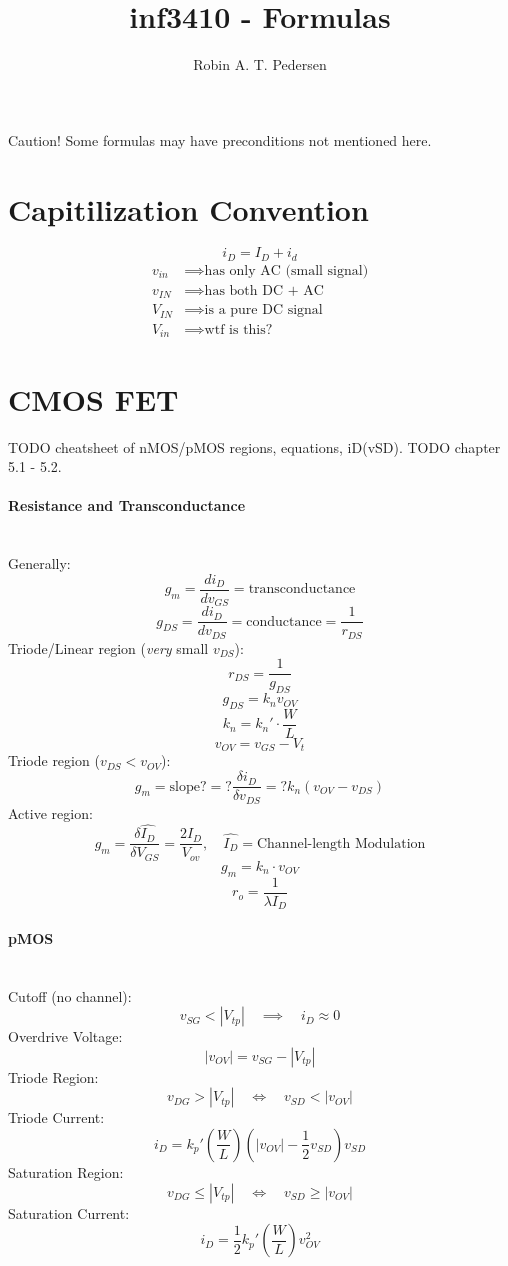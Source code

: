 \documentclass[twocolumn]{article}
\begin{document}
  \title{inf3410 - Formulas}
  \author{Robin A. T. Pedersen}
  \maketitle

  Caution! Some formulas may have preconditions not mentioned here.

  \section{Capitilization Convention}
    $$i_D = I_D + i_d$$
    \begin{align}
      v_{in} &\implies \text{has only AC (small signal)} \\
      v_{IN} &\implies \text{has both DC + AC} \\
      V_{IN} &\implies \text{is a pure DC signal} \\
      V_{in} &\implies \text{wtf is this?}
    \end{align}

  \section{CMOS FET}
    TODO cheatsheet of nMOS/pMOS regions, equations, iD(vSD).
    TODO chapter 5.1 - 5.2.

    \paragraph{Resistance and Transconductance} \hfill \\
      Generally:
        $$g_m = \frac{d i_D}{d v_{GS}} = \text{transconductance}$$
        $$g_{DS} = \frac{d i_D}{d v_{DS}} = \text{conductance}
          = \frac{1}{r_{DS}}$$
      Triode/Linear region (\emph{very} small $v_{DS}$):
        $$r_{DS} = \frac{1}{g_{DS}}$$
        $$g_{DS} = k_n v_{OV}$$
        $$k_n = k_n' \cdot \frac{W}{L}$$
        $$v_{OV} = v_{GS} - V_t$$
      Triode region ($v_{DS} < v_{OV}$):
        $$g_m = \text{slope?}
          = ?\frac{\delta i_D}{\delta v_{DS}}
          = ? k_n (v_{OV} - v_{DS})
          $$
      Active region:
        $$g_m = \frac{\delta \hat{I_D}}{\delta V_{GS}} = \frac{2 I_D}{V_{ov}}
          ,\quad \hat{I_D} = \text{Channel-length Modulation}
          $$
        $$g_m = k_n \cdot v_{OV}$$
        $$r_o = \frac{1}{\lambda I_D}$$

    \paragraph{pMOS} \hfill \\
      Cutoff (no channel):
        $$v_{SG} < |V_{tp}| \quad\implies\quad i_D \approx 0$$
      Overdrive Voltage:
        $$|v_{OV}| = v_{SG} - |V_{tp}|$$
      Triode Region:
        $$v_{DG} > |V_{tp}| \quad\Leftrightarrow\quad v_{SD} < |v_{OV}|$$
      Triode Current:
        $$i_D = k_p' \left( \frac{W}{L} \right)
                     \left( |v_{OV}| - \frac{1}{2} v_{SD} \right) v_{SD}$$
      Saturation Region:
        $$v_{DG} \leq |V_{tp}| \quad\Leftrightarrow\quad v_{SD} \geq |v_{OV}|$$
      Saturation Current:
        $$i_D = \frac{1}{2} k_p' \left( \frac{W}{L} \right) v_{OV}^2$$
\end{document}
